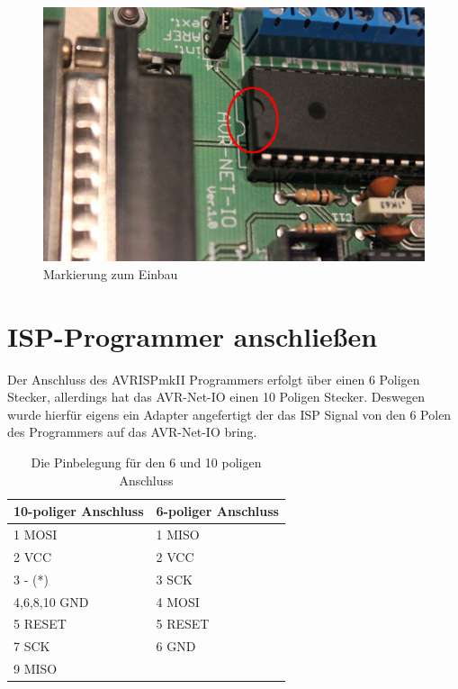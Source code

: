 \begin{figure}[H]
\centering
\includegraphics[width=13cm]{content/pictures/Anleitung/tauscheProzessor/4_Markierung.jpg}
\caption{Markierung zum Einbau}
\label{ausbau4}
\end{figure}

\section{ISP-Programmer anschließen}

Der Anschluss des AVRISPmkII Programmers erfolgt über einen 6 Poligen Stecker,
allerdings hat das AVR-Net-IO einen 10 Poligen Stecker. Deswegen wurde hierfür
eigens ein Adapter angefertigt der das ISP Signal von den 6 Polen des Programmers
auf das AVR-Net-IO bring.


\begin{table}[H]
\centering
\begin{tabular}{|l|l|} \hline
	 \textbf{10-poliger Anschluss} & \textbf{6-poliger Anschluss} \\ \hline
	 1 MOSI & 1 MISO \\ \hline
	 2 VCC & 2 VCC \\ \hline
	 3 - (*) & 3 SCK \\ \hline
	 4,6,8,10 GND & 4 MOSI \\ \hline
	 5 RESET & 5 RESET \\ \hline
	 7 SCK & 6 GND \\ \hline
	 9 MISO &   \\ \hline
\end{tabular}
\caption{Die Pinbelegung für den 6 und 10 poligen Anschluss \cite{mikrocontroller.isp}}
\label{pinbelegung}
\end{table}

